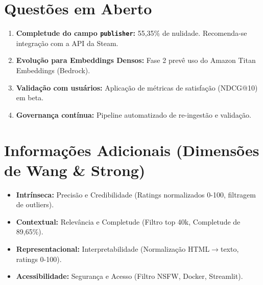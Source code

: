 \documentclass[12pt,a4paper]{article}
\begin{document}
\section{Questões em Aberto}
\begin{enumerate}
    \item \textbf{Completude do campo \texttt{publisher}:} 55,35\% de nulidade. Recomenda-se integração com a API da Steam.
    \item \textbf{Evolução para Embeddings Densos:} Fase 2 prevê uso do Amazon Titan Embeddings (Bedrock).
    \item \textbf{Validação com usuários:} Aplicação de métricas de satisfação (NDCG@10) em beta.
    \item \textbf{Governança contínua:} Pipeline automatizado de re-ingestão e validação.
\end{enumerate}

\section{Informações Adicionais (Dimensões de Wang \& Strong)}
\begin{itemize}[nosep]
    \item \textbf{Intrínseca:} Precisão e Credibilidade (Ratings normalizados 0-100, filtragem de outliers).
    \item \textbf{Contextual:} Relevância e Completude (Filtro top 40k, Completude de 89,65\%).
    \item \textbf{Representacional:} Interpretabilidade (Normalização HTML$\rightarrow$texto, ratings 0-100).
    \item \textbf{Acessibilidade:} Segurança e Acesso (Filtro NSFW, Docker, Streamlit).
\end{itemize}
\end{document}
